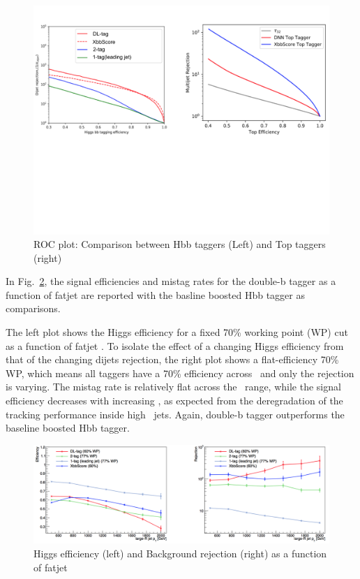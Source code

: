 \begin{figure}[htbp!]
 \centering
 \includegraphics[clip, trim=0 9cm 0 0, width=1\textwidth]{chapters/c10/figures/roc}

 \caption{ROC plot: Comparison between Hbb taggers (Left) and Top taggers (right)}
 \label{fig:xbb_roc}

\end{figure}
\par In Fig.~\ref{fig:xbb_pt}, the signal efficiencies and mistag rates for the double-b tagger as a function of fatjet \pt are reported with the basline boosted Hbb tagger as comparisons.


\par The left plot shows the Higgs efficiency for a fixed 70\% working point (WP) cut as a function of fatjet \pt. To isolate the effect of a changing Higgs efficiency from that of the changing 
dijets rejection, the right plot shows a flat-efficiency 70\% WP, which means all taggers have a 70\% efficiency across \pt~and only the rejection is varying. The mistag rate is relatively flat across the 
\pt~range, while the signal efficiency decreases with increasing \pt, as expected from the deregradation of the tracking performance inside high \pt~jets. 
Again, double-b tagger outperforms the baseline boosted Hbb tagger.
\begin{figure}[htbp!]
 \centering
 \includegraphics[clip, trim=0 0 0 0, width=1\textwidth]{chapters/c10/figures/pt}

 \caption{Higgs efficiency (left) and Background rejection (right) as a function of fatjet \pt}
 \label{fig:xbb_pt}

\end{figure}



\label{sec:con}
